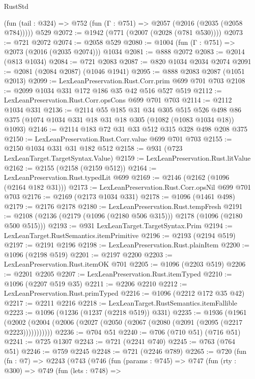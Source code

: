 \begin{lexlean}{RustStd}
\begin{coremodule}
{\begin{coremodule}
{{{{{{{{{{    (fun (tail : @324) => @752 (fun (Γ : @751) => @2057 (@2016 (@2035 (@2058 @784)))))
    @529
@2072 := @1942 (@771 (@2007 (@2028 (@781 @530))))
@2073 := @721 @2072
@2074 := @2058 @529
@2080 := @1004 (fun (Γ : @751) => @2073 (@2016 (@2035 @2074))) @1034
@2081 := @888 @2072
@2083 := @2014 (@813 @1034)
@2084 := @721 @2083
@2087 := @820 @1034 @2034 @2074
@2091 := @2081 (@2084 @2087) (@1046 @1941)
@2095 := @888 @2083 @2087 (@1051 @2013)
@2099 := LexLeanPreservation.Rust.Corr.prim @699 @701 @703
@2108 := @2099 @1034 @331 @172 @186 @35 @42 @516 @527 @519
@2112 := LexLeanPreservation.Rust.Corr.opsCons @699 @701 @703
@2114 := @2112 @1034 @331
@2136 := @2114
    @55
    @185
    @31
    @34
    @305
    @515
    @526
    @498
    @86
    @375
    (@1074 @1034 @331 @18 @31 @18 @305 (@1082 (@1083 @1034 @18)) @1093)
@2146 := @2114 @183 @72 @31 @33 @512 @315 @328 @498 @208 @375
@2150 := LexLeanPreservation.Rust.Corr.value @699 @701 @703
@2155 := @2150 @1034 @331 @31 @182 @512
@2158 := @931 (@723 LexLeanTarget.TargetSyntax.Value)
@2159 := LexLeanPreservation.Rust.litValue
@2162 := @2155 (@2158 (@2159 @512))
@2164 := LexLeanPreservation.Rust.typedLit @699
@2169 := @2146 (@2162 (@1096 (@2164 @182 @31)))
@2173 := LexLeanPreservation.Rust.Corr.opsNil @699 @701 @703
@2176 := @2169 (@2173 @1034 @331)
@2178 := @1096 (@1461 @498)
@2179 := @2176 @2178
@2180 := LexLeanPreservation.Rust.tempFresh
@2191 := @2108 (@2136 (@2179 (@1096 (@2180 @506 @315))) @2178 (@1096 (@2180 @500 @515)))
@2193 := @931 LexLeanTarget.TargetSyntax.Prim
@2194 := LexLeanTarget.RustSemantics.itemPrimitive
@2196 := @2193 (@2194 @519)
@2197 := @2191 @2196
@2198 := LexLeanPreservation.Rust.plainItem
@2200 := @1096 (@2198 @519)
@2201 := @2197 @2200
@2203 := LexLeanPreservation.Rust.itemOK @701
@2205 := @1096 (@2203 @519)
@2206 := @2201 @2205
@2207 := LexLeanPreservation.Rust.itemTyped
@2210 := @1096 (@2207 @519 @35)
@2211 := @2206 @2210
@2212 := LexLeanPreservation.Rust.primTyped
@2216 := @1096 (@2212 @172 @35 @42)
@2217 := @2211 @2216
@2218 := LexLeanTarget.RustSemantics.itemFallible
@2223 := @1096 (@1236 (@1237 (@2218 @519)) @331)
@2235 := @1936
    (@1961 (@2002 (@2004 (@2006 (@2027 (@2050 (@2067 (@2080 (@2091 (@2095 (@2217 @2223)))))))))))
@2236 := @704 @51
@2240 := @706 (@710 @51) (@716 @51)
@2241 := @725 @1307
@2243 := @721 (@2241 @740)
@2245 := @763 (@764 @51)
@2246 := @759 @2245
@2248 := @721 (@2246 @789)
@2265 := @720
    (fun (fn : @7) =>
    @2243
      (@743
        (@746
          (fun (params : @745) =>
          @747
            (fun (rty : @300) =>
            @749
              (fun (lets : @748) =>
}}}}}}}}}}
\end{coremodule}}
\end{coremodule}
\end{lexlean}
